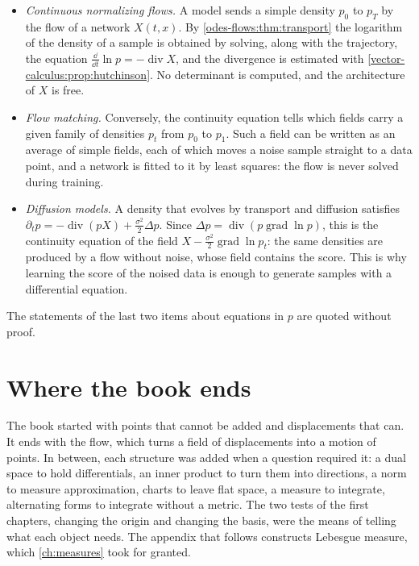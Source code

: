 \begin{notechapter}
\begin{mlthread}
\begin{itemize}[nosep]
  \item \emph{Continuous normalizing flows.} A model sends a simple
        density $p_0$ to $p_T$ by the flow of a network $X(t, x)$. By
        \cref{odes-flows:thm:transport} the logarithm of the density
        of a sample is obtained by solving, along with the
        trajectory, the equation
        $\frac{\dd}{\dd t}\ln p = -\operatorname{div}X$, and the
        divergence is estimated with
        \cref{vector-calculus:prop:hutchinson}. No determinant is
        computed, and the architecture of $X$ is free.
  \item \emph{Flow matching.} Conversely, the continuity equation
        tells which fields carry a given family of densities $p_t$
        from $p_0$ to $p_1$. Such a field can be written as an average
        of simple fields, each of which moves a noise sample straight
        to a data point, and a network is fitted to it by least
        squares: the flow is never solved during training.
  \item \emph{Diffusion models.} A density that evolves by transport
        and diffusion satisfies
        $\partial_tp = -\operatorname{div}(pX)
        + \frac{\sigma^2}2\Delta p$. Since
        $\Delta p = \operatorname{div}(p\operatorname{grad}\ln p)$,
        this is the continuity equation of the field
        $X - \frac{\sigma^2}2\operatorname{grad}\ln p_t$: the same
        densities are produced by a flow without noise, whose field
        contains the score. This is why learning the score of the
        noised data is enough to generate samples with a differential
        equation.
\end{itemize}
The statements of the last two items about equations in $p$ are quoted
without proof.
\end{mlthread}

\section{Where the book ends}\label{odes-flows:sec:outlook}

The book started with points that cannot be added and displacements
that can. It ends with the flow, which turns a field of displacements
into a motion of points. In between, each structure was added when a
question required it: a dual space to hold differentials, an inner
product to turn them into directions, a norm to measure
approximation, charts to leave flat space, a measure to integrate,
alternating forms to integrate without a metric. The two tests of the
first chapters, changing the origin and changing the basis, were the
means of telling what each object needs. The appendix that follows
constructs Lebesgue measure, which \cref{ch:measures} took for
granted.


\end{notechapter}
